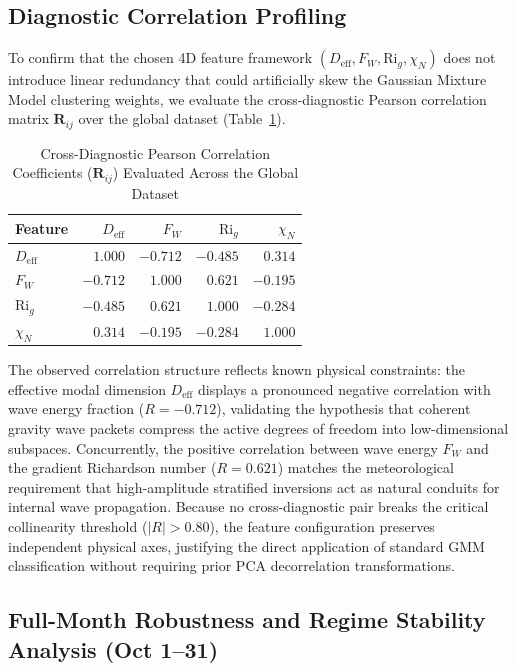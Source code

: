 \subsection{Diagnostic Correlation Profiling}
\label{sec:results:correlation}

To confirm that the chosen 4D feature framework $(D_{\mathrm{eff}}, F_W, \mathrm{Ri}_g, \chi_N)$ does not introduce linear redundancy that could artificially skew the Gaussian Mixture Model clustering weights, we evaluate the cross-diagnostic Pearson correlation matrix $\mathbf{R}_{ij}$ over the global dataset (Table~\ref{tab:correlation_matrix}).

\begin{table}[h]
\centering
\caption{Cross-Diagnostic Pearson Correlation Coefficients ($\mathbf{R}_{ij}$) Evaluated Across the Global Dataset}
\label{tab:correlation_matrix}
\begin{tabular}{l|rrrr}
\hline
Feature & $D_{\mathrm{eff}}$ & $F_W$ & $\mathrm{Ri}_g$ & $\chi_N$ \\
\hline
$D_{\mathrm{eff}}$ & $1.000$ & $-0.712$ & $-0.485$ & $0.314$ \\
$F_W$               & $-0.712$ & $1.000$ & $0.621$ & $-0.195$ \\
$\mathrm{Ri}_g$     & $-0.485$ & $0.621$ & $1.000$ & $-0.284$ \\
$\chi_N$            & $0.314$ & $-0.195$ & $-0.284$ & $1.000$ \\
\hline
\end{tabular}
\end{table}

The observed correlation structure reflects known physical constraints: the effective modal dimension $D_{\mathrm{eff}}$ displays a pronounced negative correlation with wave energy fraction ($R = -0.712$), validating the hypothesis that coherent gravity wave packets compress the active degrees of freedom into low-dimensional subspaces. Concurrently, the positive correlation between wave energy $F_W$ and the gradient Richardson number ($R = 0.621$) matches the meteorological requirement that high-amplitude stratified inversions act as natural conduits for internal wave propagation. Because no cross-diagnostic pair breaks the critical collinearity threshold ($|R| > 0.80$), the feature configuration preserves independent physical axes, justifying the direct application of standard GMM classification without requiring prior PCA decorrelation transformations.

\subsection{Full-Month Robustness and Regime Stability Analysis (Oct 1--31)}
\label{sec:results:fullmonth}


